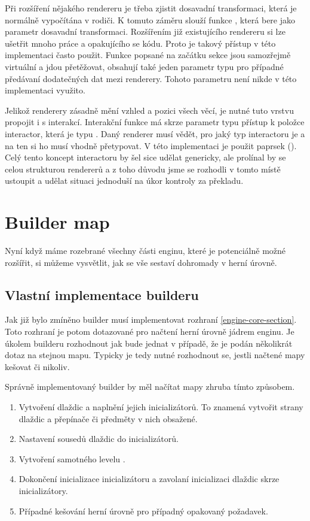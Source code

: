 Při rozšíření nějakého rendereru je třeba zjistit dosavadní transformaci, která je normálně vypočítána v rodiči.
K tomuto záměru slouží funkce , která bere jako parametr dosavadní transformaci.
Rozšířením již existujícího rendereru si lze ušetřit mnoho práce a opakujícího se kódu. Proto je takový přístup v této implementaci často použit.
Funkce popsané na začátku sekce jsou samozřejmě virtuální a jdou přetěžovat,
obsahují také jeden parametr typu  pro případné předávaní dodatečných dat mezi renderery. Tohoto parametru není nikde v této implementaci využito.

Jelikož renderery zásadně mění vzhled a pozici všech věcí, je nutné tuto vrstvu propojit i s interakcí.
Interakční funkce má skrze parametr typu   přístup k položce interactor, která je typu .
Daný renderer musí vědět, pro jaký typ interactoru je a na ten si ho musí vhodně přetypovat. V této implementaci je použit paprsek  (). 
Celý tento koncept interactoru by šel sice udělat genericky, ale prolínal by se celou strukturou rendererů a z toho
důvodu jsme se rozhodli v tomto místě ustoupit a udělat situaci jednoduší na úkor kontroly za překladu.

\section{Builder map}
Nyní když máme rozebrané všechny části enginu, které je potenciálně možné rozšířit, si můžeme vysvětlit, jak
se vše sestaví dohromady v herní úrovně.

\subsection{Vlastní implementace builderu}
Jak již bylo zmíněno builder musí implementovat rozhraní  \vref{engine-core-section}. Toto rozhraní je
potom dotazované pro načtení herní úrovně jádrem enginu. Je úkolem builderu rozhodnout jak bude jednat
v případě, že je podán několikrát dotaz na stejnou mapu. Typicky je tedy nutné rozhodnout
se, jestli načtené mapy kešovat či nikoliv. 

Správně implementovaný builder by měl načítat mapy zhruba tímto způsobem. 

\begin{enumerate}

\item Vytvoření dlaždic a naplnění jejich inicializátorů. 
To znamená vytvořit strany dlaždic a přepínače či předměty v nich obsažené.

\item Nastavení sousedů dlaždic do inicializátorů. 

\item Vytvoření samotného levelu .

\item Dokončení inicializace inicializátoru a zavolaní inicializaci dlaždic skrze inicializátory. 

\item Případné kešování herní úrovně pro případný opakovaný požadavek. 
\end{enumerate}


